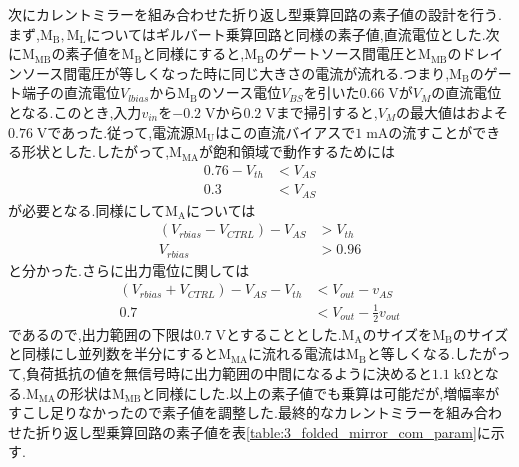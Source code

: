         次にカレントミラーを組み合わせた折り返し型乗算回路の素子値の設計を行う.まず,$\mathrm{M_{B},M_{L}}$についてはギルバート乗算回路と同様の素子値,直流電位とした.次に$\mathrm{M_{MB}}$の素子値を$\mathrm{M_{B}}$と同様にすると,$\mathrm{M_{B}}$のゲートソース間電圧と$\mathrm{M_{MB}}$のドレインソース間電圧が等しくなった時に同じ大きさの電流が流れる.つまり,$\mathrm{M_{B}}$のゲート端子の直流電位$V_{lbias}$から$\mathrm{M_{B}}$のソース電位$V_{BS}$を引いた$0.66\;\mathrm{V}$が$V_{M}$の直流電位となる.このとき,入力$v_{in}$を$-0.2\;\mathrm{V}$から$0.2\;\mathrm{V}$まで掃引すると,$V_{M}$の最大値はおよそ$0.76\;\mathrm{V}$であった.従って,電流源$\mathrm{M_{U}}$はこの直流バイアスで$1\;\mathrm{mA}$の流すことができる形状とした.したがって,$\mathrm{M_{MA}}$が飽和領域で動作するためには
        \begin{align*}
            0.76-V_{th} &< V_{AS}      \\
            0.3 &< V_{AS}
        \end{align*}
        が必要となる.同様にして$\mathrm{M_{A}}$については
        \begin{align*}
            \left( V_{rbias}-V_{CTRL} \right) -V_{AS} &> V_{th}     \\
            V_{rbias} &> 0.96
        \end{align*}
        と分かった.さらに出力電位に関しては
        \begin{align*}
            \left( V_{rbias}+V_{CTRL} \right) - V_{AS} - V_{th} &< V_{out} - v_{AS} \\
            0.7 &< V_{out} - \frac{1}{2}v_{out}
        \end{align*}
        であるので,出力範囲の下限は$0.7\;\mathrm{V}$とすることとした.$\mathrm{M_{A}}$のサイズを$\mathrm{M_{B}}$のサイズと同様にし並列数を半分にすると$\mathrm{M_{MA}}$に流れる電流は$\mathrm{M_{B}}$と等しくなる.したがって,負荷抵抗の値を無信号時に出力範囲の中間になるように決めると$1.1\;\mathrm{k\Omega}$となる.$\mathrm{M_{MA}}$の形状は$\mathrm{M_{MB}}$と同様にした.以上の素子値でも乗算は可能だが,増幅率がすこし足りなかったので素子値を調整した.最終的なカレントミラーを組み合わせた折り返し型乗算回路の素子値を表\ref{table:3_folded_mirror_com_param}に示す.
